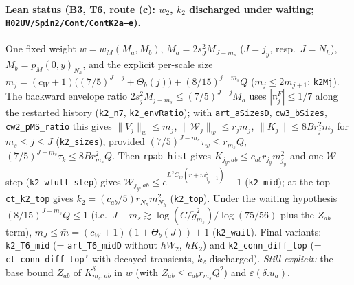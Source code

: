 \documentclass[11pt]{amsart}
\theoremstyle{definition}
\theoremstyle{remark}
\numberwithin{equation}{section}
\begin{document}
\paragraph{Lean status (B3, T6, route (c): $w_2$, $k_2$ discharged under waiting; \texttt{H02UV/Spin2/Cont/ContK2a--e}).}
One fixed weight $w=w_M(M_a,M_b)$, $M_a=2s_J^2M_{J-m_s}$ ($J=j_y$, resp.\ $J=N_h$), $M_b=p_M(0,y)_{N_h}$, and the
explicit per-scale size $m_j=(c_W+1)\bigl((7/5)^{J-j}+\Theta_b(j)\bigr)+(8/15)^{j-m_s}Q$ ($m_j\le2m_{j+1}$;
\texttt{k2Mj}). The backward envelope ratio $2s_j^2M_{j-m_s}\le(7/5)^{J-j}M_a$ uses $|\mathfrak n^F_j|\le1/7$
along the restarted history (\texttt{k2\_n7}, \texttt{k2\_envRatio}); with \texttt{art\_aSizesD}, \texttt{cw3\_bSizes},
\texttt{cw2\_pMS\_ratio} this gives $\|V_j\|_w\le m_j$, $\|\mathcal W_j\|_w\le r_jm_j$, $\|K_j\|\le8Br_j^2m_j$ for
$m_s\le j\le J$ (\texttt{k2\_sizes}), provided $(7/5)^{J-m_s}\tau_w\le r_{m_s}Q$, $(7/5)^{J-m_s}\tau_k\le8Br_{m_s}^2Q$.
Then \texttt{rpab\_hist} gives $K_{j_y,ab}\le c_{ab}r_{j_y}m_{j_y}^2$ and one $\mathcal W$ step
(\texttt{k2\_wfull\_step}) gives $\mathcal W_{j_y,ab}\le e^{L^2C_w(r+m_{j_y-1}^2)}-1$ (\texttt{k2\_mid}); at the top
\texttt{ct\_k2\_top} gives $k_2=(c_{ab}/5)r_{N_h}m_{N_h}^2$ (\texttt{k2\_top}). Under the waiting hypothesis
$(8/15)^{J-m_s}Q\le1$ (i.e.\ $J-m_s\gtrsim\log(C/\check g_{m_s}^2)/\log(75/56)$ plus the $Z_{ab}$ term),
$m_J\le\bar m=(c_W+1)(1+\Theta_b(J))+1$ (\texttt{k2\_wait}). Final variants: \texttt{k2\_T6\_mid}
(= \texttt{art\_T6\_midD} without $hW_2$, $hK_2$) and \texttt{k2\_conn\_diff\_top} (= \texttt{ct\_conn\_diff\_top'} with
decayed transients, $k_2$ discharged). \emph{Still explicit:} the base bound $Z_{ab}$ of $K^\delta_{m_s,ab}$ in $w$
(with $Z_{ab}\le c_{ab}r_{m_s}Q^2$) and $\varepsilon(\delta.u_a)$.
\end{document}

